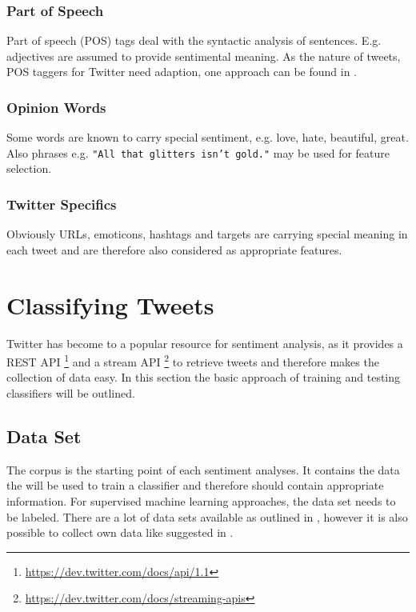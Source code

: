 \documentclass{acm_proc_article-sp}
\begin{document}
\subsubsection{Part of Speech} Part of speech (POS) tags deal with the
syntactic analysis of sentences. E.g. adjectives are assumed to provide
sentimental meaning. \cite{liu2010sentimentanalysis} As the nature of tweets,
POS taggers for Twitter need adaption, one approach can be found in
\cite{gimpel2011part}. 

\subsubsection{Opinion Words} Some words are known to carry special sentiment,
e.g. love, hate, beautiful, great. Also phrases e.g. \texttt{"All that glitters
isn't gold."} may be used for feature selection.
\cite{liu2010sentimentanalysis}

\subsubsection{Twitter Specifics} Obviously URLs, emoticons, hashtags and
targets are carrying special meaning in each tweet and are therefore also
considered as appropriate features. \cite{gimpel2011part}

\section{Classifying Tweets} \label{classification} Twitter has become to a
popular resource for sentiment analysis, as it provides a REST API
\footnote{\url{https://dev.twitter.com/docs/api/1.1}} and a stream API
\footnote{\url{https://dev.twitter.com/docs/streaming-apis}} to retrieve tweets
and therefore makes the collection of data easy.  In this section the basic
approach of training and testing classifiers will be outlined.


\subsection{Data Set} The corpus is the starting point of each sentiment
analyses. It contains the data the will be used to train a classifier and
therefore should contain appropriate information. For supervised machine
learning approaches, the data set needs to be labeled. There are a lot of data
sets available as outlined in \cite{kouloumpis2011twitter}, however it is also
possible to collect own data like suggested in \cite{pak2010twitter}.
\end{document}

